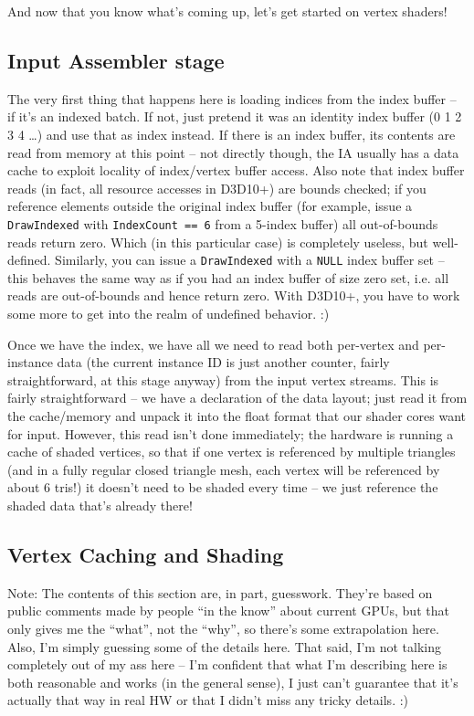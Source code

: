 \documentclass[12pt]{article}
\begin{document}
And now that you know what’s coming up, let’s get started on vertex shaders!

\subsection{Input Assembler stage}
\label{sec:org9791e98}

The very first thing that happens here is loading indices from the index buffer – if it’s an indexed batch.
If not, just pretend it was an identity index buffer (0 1 2 3 4 …) and use that as index instead.
If there is an index buffer, its contents are read from memory at this point – not directly though, the IA usually has a data cache to exploit locality of index/vertex buffer access.
Also note that index buffer reads (in fact, all resource accesses in D3D10+) are bounds checked; if you reference elements outside the original index buffer (for example, issue a \texttt{DrawIndexed} with \texttt{IndexCount == 6} from a 5-index buffer) all out-of-bounds reads return zero.
Which (in this particular case) is completely useless, but well-defined.
Similarly, you can issue a \texttt{DrawIndexed} with a \texttt{NULL} index buffer set – this behaves the same way as if you had an index buffer of size zero set, i.e. all reads are out-of-bounds and hence return zero.
With D3D10+, you have to work some more to get into the realm of undefined behavior. :)

Once we have the index, we have all we need to read both per-vertex and per-instance data (the current instance ID is just another counter, fairly straightforward, at this stage anyway) from the input vertex streams.
This is fairly straightforward – we have a declaration of the data layout; just read it from the cache/memory and unpack it into the float format that our shader cores want for input.
However, this read isn’t done immediately; the hardware is running a cache of shaded vertices, so that if one vertex is referenced by multiple triangles (and in a fully regular closed triangle mesh, each vertex will be referenced by about 6 tris!) it doesn’t need to be shaded every time – we just reference the shaded data that’s already there!

\subsection{Vertex Caching and Shading}
\label{sec:org5516200}

Note: The contents of this section are, in part, guesswork.
They’re based on public comments made by people “in the know” about current GPUs, but that only gives me the “what”, not the “why”, so there’s some extrapolation here.
Also, I’m simply guessing some of the details here.
That said, I’m not talking completely out of my ass here – I’m confident that what I’m describing here is both reasonable and works (in the general sense), I just can’t guarantee that it’s actually that way in real HW or that I didn’t miss any tricky details. :)
\end{document}
